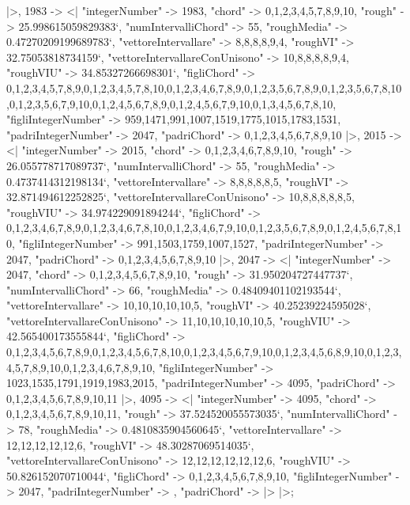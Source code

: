 \documentclass[
]{article}
\begin{document}
\begin{DatasetVerbatim}
  |>,
  1983 -> <|
    "integerNumber" -> 1983,
    "chord" -> {0,1,2,3,4,5,7,8,9,10},
    "rough" -> 25.998615059829383`,
    "numIntervalliChord" -> 55,
    "roughMedia" -> 0.47270209199689783`,
    "vettoreIntervallare" -> {8,8,8,8,9,4},
    "roughVI" -> 32.75053818734159`,
    "vettoreIntervallareConUnisono" -> {10,8,8,8,8,9,4},
    "roughVIU" -> 34.85327266698301`,
    "figliChord" -> {{0,1,2,3,4,5,7,8,9},{0,1,2,3,4,5,7,8,10},{0,1,2,3,4,6,7,8,9},{0,1,2,3,5,6,7,8,9},{0,1,2,3,5,6,7,8,10},{0,1,2,3,5,6,7,9,10},{0,1,2,4,5,6,7,8,9},{0,1,2,4,5,6,7,9,10},{0,1,3,4,5,6,7,8,10}},
    "figliIntegerNumber" -> {959,1471,991,1007,1519,1775,1015,1783,1531},
    "padriIntegerNumber" -> {2047},
    "padriChord" -> {{0,1,2,3,4,5,6,7,8,9,10}}
  |>,
  2015 -> <|
    "integerNumber" -> 2015,
    "chord" -> {0,1,2,3,4,6,7,8,9,10},
    "rough" -> 26.055778717089737`,
    "numIntervalliChord" -> 55,
    "roughMedia" -> 0.4737414312198134`,
    "vettoreIntervallare" -> {8,8,8,8,8,5},
    "roughVI" -> 32.871494612252825`,
    "vettoreIntervallareConUnisono" -> {10,8,8,8,8,8,5},
    "roughVIU" -> 34.974229091894244`,
    "figliChord" -> {{0,1,2,3,4,6,7,8,9},{0,1,2,3,4,6,7,8,10},{0,1,2,3,4,6,7,9,10},{0,1,2,3,5,6,7,8,9},{0,1,2,4,5,6,7,8,10}},
    "figliIntegerNumber" -> {991,1503,1759,1007,1527},
    "padriIntegerNumber" -> {2047},
    "padriChord" -> {{0,1,2,3,4,5,6,7,8,9,10}}
  |>,
  2047 -> <|
    "integerNumber" -> 2047,
    "chord" -> {0,1,2,3,4,5,6,7,8,9,10},
    "rough" -> 31.950204727447737`,
    "numIntervalliChord" -> 66,
    "roughMedia" -> 0.48409401102193544`,
    "vettoreIntervallare" -> {10,10,10,10,10,5},
    "roughVI" -> 40.25239224595028`,
    "vettoreIntervallareConUnisono" -> {11,10,10,10,10,10,5},
    "roughVIU" -> 42.565400173555844`,
    "figliChord" -> {{0,1,2,3,4,5,6,7,8,9},{0,1,2,3,4,5,6,7,8,10},{0,1,2,3,4,5,6,7,9,10},{0,1,2,3,4,5,6,8,9,10},{0,1,2,3,4,5,7,8,9,10},{0,1,2,3,4,6,7,8,9,10}},
    "figliIntegerNumber" -> {1023,1535,1791,1919,1983,2015},
    "padriIntegerNumber" -> {4095},
    "padriChord" -> {{0,1,2,3,4,5,6,7,8,9,10,11}}
  |>,
  4095 -> <|
    "integerNumber" -> 4095,
    "chord" -> {0,1,2,3,4,5,6,7,8,9,10,11},
    "rough" -> 37.524520055573035`,
    "numIntervalliChord" -> 78,
    "roughMedia" -> 0.4810835904560645`,
    "vettoreIntervallare" -> {12,12,12,12,12,6},
    "roughVI" -> 48.30287069514035`,
    "vettoreIntervallareConUnisono" -> {12,12,12,12,12,12,6},
    "roughVIU" -> 50.826152070710044`,
    "figliChord" -> {{0,1,2,3,4,5,6,7,8,9,10}},
    "figliIntegerNumber" -> {2047},
    "padriIntegerNumber" -> {},
    "padriChord" -> {}
  |>
|>;
\end{DatasetVerbatim}
\end{document}
